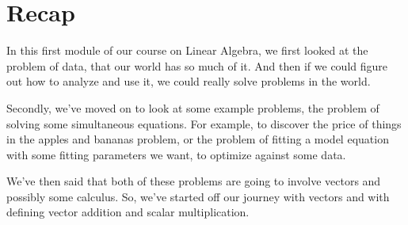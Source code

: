 \documentclass[]{article}
\begin{document}
\section{Recap}

In this first module of our course on Linear Algebra, we first looked at the problem of data, that our world has so much of it. And then if we could figure out how to analyze and use it, we could really solve problems in the world.

Secondly, we've moved on to look at some example problems, the problem of solving some simultaneous equations. For example, to discover the price of things in the apples and bananas problem, or the problem of fitting a model equation with some fitting parameters we want, to optimize against some data.

We've then said that both of these problems are going to involve vectors and possibly some calculus. So, we've started off our journey with vectors and with defining vector addition and scalar multiplication.

\nocite{*}

\printbibliography
\end{document}
